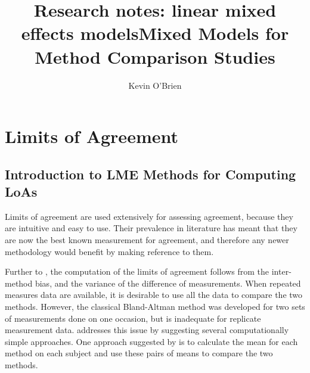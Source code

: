\documentclass[12pt, a4paper]{report}
\title{Research notes: linear mixed effects models}
\author{ } \date{ }
\theoremstyle{plain}
\theoremstyle{definition}
\theoremstyle{remark}
\begin{document}
\author{Kevin O'Brien}
\title{Mixed Models for Method Comparison Studies}


\chapter{Limits of Agreement}




\section{Introduction to LME Methods for Computing LoAs}

Limits of agreement are used extensively for assessing agreement, because they are intuitive and easy to use. Their prevalence in literature has meant that they are now the best known measurement for agreement, and therefore any newer methodology would benefit by making reference to them.

Further to \citet{BA86}, the computation of the limits of agreement follows from the inter-method bias, and the variance of the difference of measurements. When repeated measures data are available, it is desirable to use all the data to compare the two methods. However, the classical Bland-Altman method was developed for two sets of measurements done on one occasion, but is inadequate for replicate measurement data. \citet{BA99} addresses this issue by suggesting several computationally simple approaches.  One approach suggested by \citet{BA99} is to calculate
the mean for each method on each subject and use these pairs of means to compare the two methods. 
\end{document}
